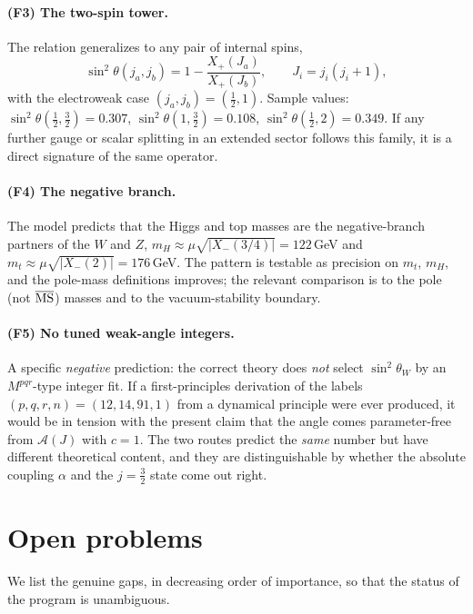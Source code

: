 \documentclass[11pt]{article}
\theoremstyle{plain}
\theoremstyle{definition}
\newcommand{\cA}{\mathcal{A}}
\newcommand{\Xp}{X_{+}}
\newcommand{\Xm}{X_{-}}
\newcommand{\half}{\tfrac12}
\newcommand{\sinsq}{\sin^{2}\theta_W}
\begin{document}
\paragraph{(F3) The two-spin tower.}
The relation generalizes to any pair of internal spins,
\begin{equation}
\sin^2\theta(j_a,j_b)=1-\frac{\Xp(J_a)}{\Xp(J_b)},
\qquad J_i=j_i(j_i+1),
\end{equation}
with the electroweak case $(j_a,j_b)=(\half,1)$. Sample values:
$\sin^2\theta(\half,\tfrac32)=0.307$,
$\sin^2\theta(1,\tfrac32)=0.108$,
$\sin^2\theta(\half,2)=0.349$. If any further gauge or scalar splitting in
an extended sector follows this family, it is a direct signature of the same
operator.

\paragraph{(F4) The negative branch.}
The model predicts that the Higgs and top masses are the negative-branch
partners of the $W$ and $Z$, $m_H\approx\mu\sqrt{|\Xm(3/4)|}=122\,$GeV and
$m_t\approx\mu\sqrt{|\Xm(2)|}=176\,$GeV. The pattern is testable as
precision on $m_t$, $m_H$, and the pole-mass definitions improves; the
relevant comparison is to the pole (not $\overline{\rm MS}$) masses and to
the vacuum-stability boundary.

\paragraph{(F5) No tuned weak-angle integers.}
A specific \emph{negative} prediction: the correct theory does \emph{not}
select $\sinsq$ by an $M^{pqr}$-type integer fit. If a first-principles
derivation of the labels $(p,q,r,n)=(12,14,91,1)$ from a dynamical
principle were ever produced, it would be in tension with the present claim
that the angle comes parameter-free from $\cA(J)$ with $c=1$. The two
routes predict the \emph{same} number but have different theoretical
content, and they are distinguishable by whether the absolute coupling
$\alpha$ and the $j=\tfrac32$ state come out right.

\section{Open problems}
\label{sec:open}

We list the genuine gaps, in decreasing order of importance, so that the
status of the program is unambiguous.
\end{document}

